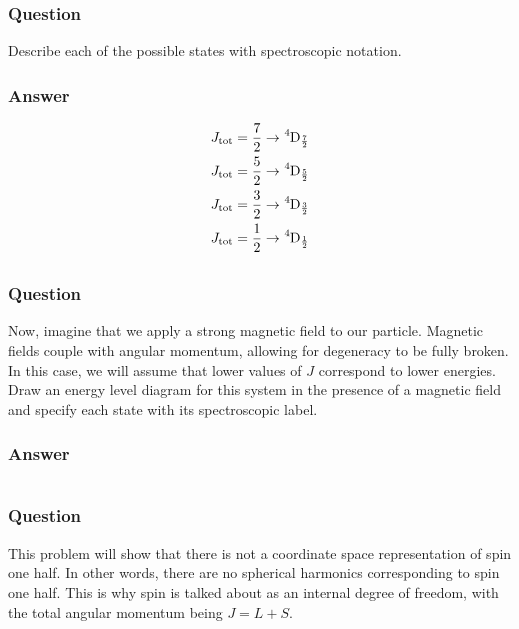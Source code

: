 \documentclass[12pt]{article}
\begin{document}
\subsubsection{Question}
Describe each of the possible states with spectroscopic notation.
\subsubsection{Answer}
\begin{align*}
J_{\text{tot}} &= \frac{7}{2} 
\rightarrow \ce{^{4}D_{\frac{7}{2}}}
\\
J_{\text{tot}} &= \frac{5}{2}
\rightarrow \ce{^{4}D_{\frac{5}{2}}}
\\
J_{\text{tot}} &= \frac{3}{2}
\rightarrow \ce{^{4}D_{\frac{3}{2}}}
\\
J_{\text{tot}} &= \frac{1}{2}
\rightarrow \ce{^{4}D_{\frac{1}{2}}}
\end{align*}
\subsection{}
\subsubsection{Question}
Now, imagine that we apply a strong magnetic field to our particle. Magnetic fields couple with angular momentum, allowing for degeneracy to be fully broken. In this case, we will assume that lower values of $J$ correspond to lower energies. Draw an energy level diagram for this system in the presence of a magnetic field and specify each state with its spectroscopic label.
\subsubsection{Answer}
\begin{center}
\end{center}
\section{}
\subsubsection{Question}
This problem will show that there is not a coordinate space representation of spin one half. In other words, there are no spherical harmonics corresponding to spin one half. This is why spin is talked about as an internal degree of freedom, with the total angular momentum being $J=L+S$.
\end{document}
